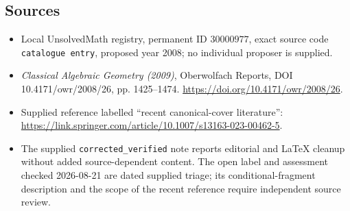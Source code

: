 \documentclass[11pt]{article}
\begin{document}
\subsection{Sources}
\begin{itemize}
\item Local UnsolvedMath registry, permanent ID \(30000977\), exact source code \texttt{catalogue entry}, proposed year 2008; no individual proposer is supplied.
\item \emph{Classical Algebraic Geometry (2009)}, Oberwolfach Reports, DOI 10.4171/owr/2008/26, pp. 1425--1474. \url{https://doi.org/10.4171/owr/2008/26}.
\item Supplied reference labelled ``recent canonical-cover literature'': \url{https://link.springer.com/article/10.1007/s13163-023-00462-5}.
\item The supplied \texttt{corrected\_verified} note reports editorial and LaTeX cleanup without added source-dependent content. The open label and assessment checked 2026-08-21 are dated supplied triage; its conditional-fragment description and the scope of the recent reference require independent source review.
\end{itemize}
\end{document}
